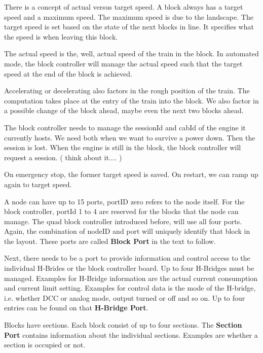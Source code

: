 
There is a concept of actual versus target speed. A block always has a target speed and a maximum speed. The maximum speed is due to the landscape. The target speed is set based on the state of the next blocks in line. It specifies what the speed is when leaving this block. 

The actual speed is the, well, actual speed of the train in the block. In automated mode, the block controller will manage the actual speed such that the target speed at the end of the block is achieved.

Accelerating or decelerating also factors in the rough position of the train. The computation takes place at the entry of the train into the block. We also factor in a possible change of the block ahead, maybe even the next two blocks ahead.

The block controller needs to manage the sessionId and cabId of the engine it currently hosts. We need both when we want to survive a power down. Then the session is lost. When the engine is still in the block, the block controller will request a session. ( think about it.... )

On emergency stop, the former target speed is saved. On restart, we can ramp up again to target speed.


A node can have up to 15 ports, portID zero refers to the node itself. For the block controller, portId 1 to 4 are reserved for the blocks that the node can manage. The quad block controller introduced before, will use all four ports. Again, the combination of nodeID and port will uniquely identify that block in the layout. These ports are called \textbf{Block Port} in the text to follow.

Next, there needs to be a port to provide information and control access to the individual H-Brides or the block controller board. Up to four H-Bridges must be managed. Examples for H-Bridge information are the actual current consumption and current limit setting. Examples for control data is the mode of the H-bridge, i.e. whether DCC or analog mode, output turned or off and so on. Up to four entries can be found on that \textbf{H-Bridge Port}.

Blocks have sections. Each block consist of up to four sections. The \textbf{Section Port} contains information about the individual sections. Examples are whether a section is occupied or not.

